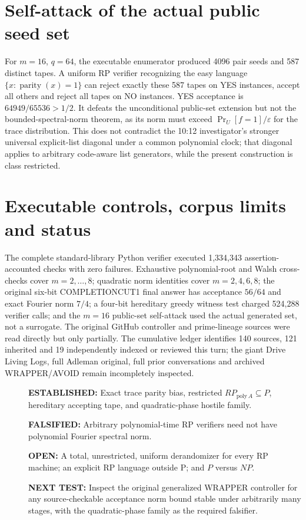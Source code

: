 \documentclass[11pt]{article}
\begin{document}
\section{Self-attack of the actual public seed set}
For $m=16$, $q=64$, the executable enumerator produced 4096 pair seeds and 587 distinct tapes. A uniform RP verifier recognizing the easy language $\{x:\operatorname{parity}(x)=1\}$ can reject exactly these 587 tapes on YES instances, accept all others and reject all tapes on NO instances. YES acceptance is $64949/65536>1/2$. It defeats the unconditional public-set extension but not the bounded-spectral-norm theorem, as its norm must exceed $\Pr_U[f=1]/\varepsilon$ for the trace distribution. This does not contradict the 10:12 investigator's stronger universal explicit-list diagonal under a common polynomial clock; that diagonal applies to arbitrary code-aware list generators, while the present construction is class restricted.
\section{Executable controls, corpus limits and status}
The complete standard-library Python verifier executed 1,334,343 assertion-accounted checks with zero failures. Exhaustive polynomial-root and Walsh cross-checks cover $m=2,\ldots,8$; quadratic norm identities cover $m=2,4,6,8$; the original six-bit COMPLETIONCUT1 final answer has acceptance $56/64$ and exact Fourier norm $7/4$; a four-bit hereditary greedy witness test charged 524,288 verifier calls; and the $m=16$ public-set self-attack used the actual generated set, not a surrogate. The original GitHub controller and prime-lineage sources were read directly but only partially. The cumulative ledger identifies 140 sources, 121 inherited and 19 independently indexed or reviewed this turn; the giant Drive Living Logs, full Adleman original, full prior conversations and archived WRAPPER/AVOID remain incompletely inspected.

\begin{description}
\item[]\textbf{ESTABLISHED:} Exact trace parity bias, restricted $RP_{\mathrm{poly}\,A}\subseteq P$, hereditary accepting tape, and quadratic-phase hostile family.
\item[]\textbf{FALSIFIED:} Arbitrary polynomial-time RP verifiers need not have polynomial Fourier spectral norm.
\item[]\textbf{OPEN:} A total, unrestricted, uniform derandomizer for every RP machine; an explicit RP language outside P; and $P$ versus $NP$.
\item[]\textbf{NEXT TEST:} Inspect the original generalized WRAPPER controller for any source-checkable acceptance norm bound stable under arbitrarily many stages, with the quadratic-phase family as the required falsifier.
\end{description}

\end{document}
